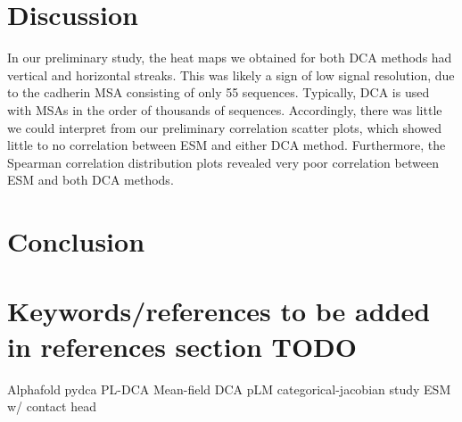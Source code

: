 \documentclass{article}
\begin{document}
\section{Discussion}

In our preliminary study, the heat maps we obtained for both DCA methods had vertical and horizontal streaks. This was likely a sign of low signal resolution, due to the cadherin MSA consisting of only 55 sequences. Typically, DCA is used with MSAs in the order of thousands of sequences. Accordingly, there was little we could interpret from our preliminary correlation scatter plots, which showed little to no correlation between ESM and either DCA method. Furthermore, the Spearman correlation distribution plots revealed very poor correlation between ESM and both DCA methods. 



\section{Conclusion}



\section{Keywords/references to be added in references section TODO}
Alphafold \cite{AlphaFold}
pydca \cite{pydca}
PL-DCA \cite{Ekeberg}
Mean-field DCA \cite{Morcos}
pLM categorical-jacobian study \cite{Zhang}
ESM w/ contact head \cite{ESMContactHead}



\end{document}
